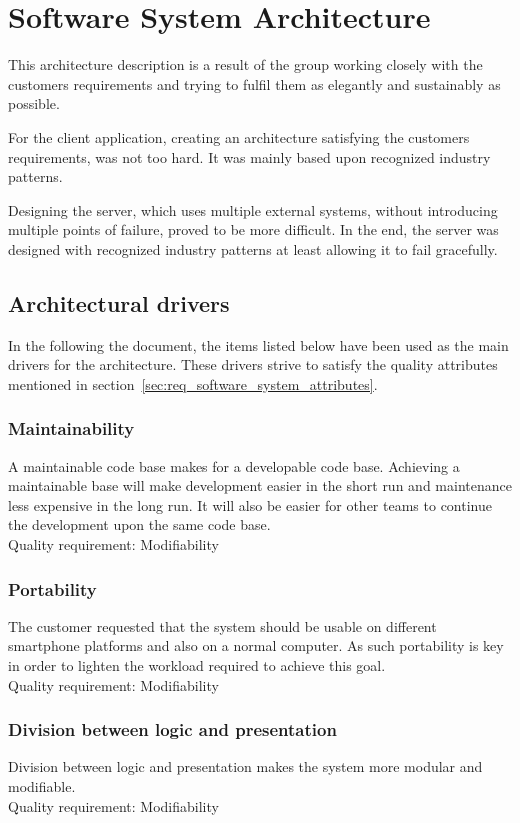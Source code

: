 \documentclass[11pt]{book}
\begin{document}
\chapter{Software System Architecture}\label{chap:architecture}
This architecture description is a result of the group working closely with the customers requirements and trying to fulfil them as elegantly and sustainably as possible.

For the client application, creating an architecture satisfying the customers requirements, was not too hard. It was  mainly based upon recognized industry patterns.

Designing the server, which uses multiple external systems, without introducing multiple points of failure, proved to be more difficult. In the end, the server was designed with recognized industry patterns at least allowing it to fail gracefully.

\section{Architectural drivers} \label{sec:architecture_drivers}
In the following the document, the items listed below have been used as the main drivers for the architecture. These drivers strive to satisfy the quality attributes mentioned in section~\ref{sec:req_software_system_attributes}.

\subsection{Maintainability} 
A maintainable code base makes for a developable code base. Achieving a maintainable base will make development easier in the short run and maintenance less expensive in the long run. It will also be easier for other teams to continue the development upon the same code base.\\
Quality requirement: Modifiability

\subsection{Portability}
The customer requested that the system should be usable on different smartphone platforms and also on a normal computer. As such portability is key in order to lighten the workload required to achieve this goal.\\
Quality requirement: Modifiability

\subsection{Division between logic and presentation}
Division between logic and presentation makes the system more modular and modifiable.\\
Quality requirement: Modifiability
\end{document}
